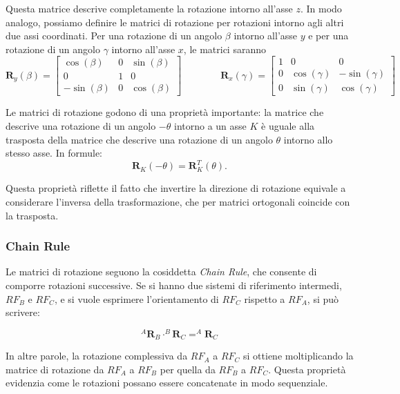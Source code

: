 \documentclass[11pt, a4paper]{report}
\begin{document}
Questa matrice descrive completamente la rotazione intorno all'asse $z$. In modo analogo, possiamo definire le matrici di rotazione per rotazioni intorno agli altri due assi coordinati. Per una rotazione di un angolo $\beta$ intorno all'asse $y$ e per una rotazione di un angolo $\gamma$ intorno all'asse $x$, le matrici saranno
\[
\mathbf{R}_{y}(\beta) =
\begin{bmatrix}
    \cos(\beta) & 0 & \sin(\beta) \\
    0 & 1 & 0 \\
    -\sin(\beta) & 0 & \cos(\beta)
\end{bmatrix}
\qquad\qquad
\mathbf{R}_{x}(\gamma) =
\begin{bmatrix}
    1 & 0 & 0 \\
    0 & \cos(\gamma) & -\sin(\gamma) \\
    0 & \sin(\gamma) & \cos(\gamma)
\end{bmatrix}
\]

Le matrici di rotazione godono di una proprietà importante: la matrice che descrive una rotazione di un angolo $-\theta$ intorno a un asse $K$ è uguale alla trasposta della matrice che descrive una rotazione di un angolo $\theta$ intorno allo stesso asse. In formule:
\[
\mathbf{R}_{K}(-\theta) = \mathbf{R}_{K}^{T}(\theta).
\]

Questa proprietà riflette il fatto che invertire la direzione di rotazione equivale a considerare l'inversa della trasformazione, che per matrici ortogonali coincide con la trasposta.
\subsubsection{Chain Rule}
Le matrici di rotazione seguono la cosiddetta \emph{Chain Rule}, che consente di comporre rotazioni successive. Se si hanno due sistemi di riferimento intermedi, \( RF_{B} \) e \( RF_{C} \), e si vuole esprimere l'orientamento di \( RF_{C} \) rispetto a \( RF_{A} \), si può scrivere:

\[
^{A}\mathbf{R}_{B} \cdot ^{B}\mathbf{R}_{C} = ^{A}\mathbf{R}_{C}
\]

In altre parole, la rotazione complessiva da \( RF_{A} \) a \( RF_{C} \) si ottiene moltiplicando la matrice di rotazione da \( RF_{A} \) a \( RF_{B} \) per quella da \( RF_{B} \) a \( RF_{C} \). Questa proprietà evidenzia come le rotazioni possano essere concatenate in modo sequenziale.
\newpage
\end{document}

